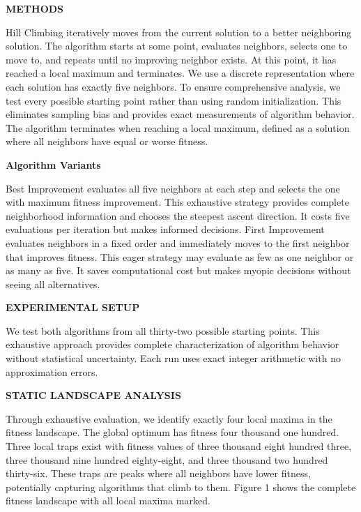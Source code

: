 \documentclass[
]{article}
\begin{document}
\begin{center}
\textbf{METHODS}
\end{center}

Hill Climbing iteratively moves from the current solution to a better
neighboring solution. The algorithm starts at some point, evaluates
neighbors, selects one to move to, and repeats until no improving
neighbor exists. At this point, it has reached a local maximum and
terminates. We use a discrete representation where each solution has
exactly five neighbors. To ensure comprehensive analysis, we test every
possible starting point rather than using random initialization. This
eliminates sampling bias and provides exact measurements of algorithm
behavior. The algorithm terminates when reaching a local maximum,
defined as a solution where all neighbors have equal or worse fitness.

\textbf{Algorithm Variants}

Best Improvement evaluates all five neighbors at each
step and selects the one with maximum fitness improvement. This
exhaustive strategy provides complete neighborhood information and
chooses the steepest ascent direction. It costs five evaluations per
iteration but makes informed decisions. First Improvement evaluates
neighbors in a fixed order and immediately moves to the first neighbor
that improves fitness. This eager strategy may evaluate as few as one
neighbor or as many as five. It saves computational cost but makes
myopic decisions without seeing all alternatives.

\begin{center}
\textbf{EXPERIMENTAL SETUP}
\end{center}

We test both algorithms from all thirty-two possible starting points.
This exhaustive approach provides complete characterization of algorithm
behavior without statistical uncertainty. Each run uses exact integer
arithmetic with no approximation errors.

\begin{center}
\textbf{STATIC LANDSCAPE ANALYSIS}
\end{center}

Through exhaustive evaluation, we identify exactly four local maxima in
the fitness landscape. The global optimum has fitness four thousand one
hundred. Three local traps exist with fitness values of three thousand
eight hundred three, three thousand nine hundred eighty-eight, and three
thousand two hundred thirty-six. These traps are peaks where all
neighbors have lower fitness, potentially capturing algorithms that
climb to them. Figure 1 shows the complete fitness landscape with all
local maxima marked.
\end{document}
